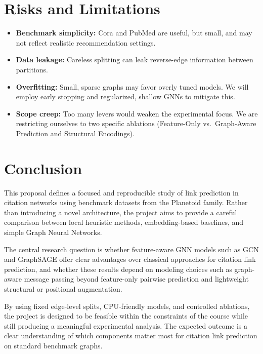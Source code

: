 \documentclass[11pt,a4paper]{article}
\begin{document}
\section{Risks and Limitations}

\begin{itemize}
    \item \textbf{Benchmark simplicity:} Cora and PubMed are useful, but small, and may not reflect realistic recommendation settings.
    \item \textbf{Data leakage:} Careless splitting can leak reverse-edge information between partitions.
    \item \textbf{Overfitting:} Small, sparse graphs may favor overly tuned models. We will employ early stopping and regularized, shallow GNNs to mitigate this.
    \item \textbf{Scope creep:} Too many levers would weaken the experimental focus. We are restricting ourselves to two specific ablations (Feature-Only vs.\ Graph-Aware Prediction and Structural Encodings).
\end{itemize}

\section{Conclusion}

This proposal defines a focused and reproducible study of link prediction in citation networks
using benchmark datasets from the Planetoid family.
Rather than introducing a novel architecture, the project aims to provide a careful comparison
between local heuristic methods, embedding-based baselines, and simple Graph Neural Networks.

The central research question is whether feature-aware GNN models such as GCN and GraphSAGE
offer clear advantages over classical approaches for citation link prediction,
and whether these results depend on modeling choices such as graph-aware message passing beyond feature-only pairwise prediction
and lightweight structural or positional augmentation.

By using fixed edge-level splits, CPU-friendly models, and controlled ablations,
the project is designed to be feasible within the constraints of the course
while still producing a meaningful experimental analysis.
The expected outcome is a clear understanding of which components matter most
for citation link prediction on standard benchmark graphs.



\end{document}
